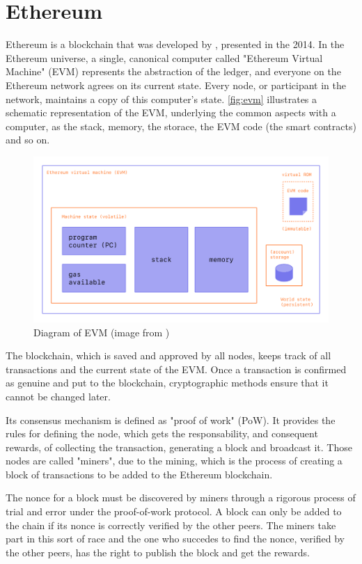 \section{Ethereum}
\label{sec:Backgroud:Ethereum}

Ethereum is a blockchain that was developed by \citet{Ethereum}, presented in the 2014.  
In the Ethereum universe, a single, canonical computer called "Ethereum Virtual Machine"  (EVM) represents the abstraction of the ledger, and everyone on the Ethereum network agrees on its current state.
Every node, or participant in the network, maintains a copy of this computer's state. 
\autoref{fig:evm} illustrates a schematic representation of the EVM, underlying the common aspects with a computer, as the stack, memory, the storace, the EVM code (the smart contracts) and so on.


\begin{figure}
    \centering
    \includegraphics[width=13cm]{logos/evm.png}
    \caption{Diagram of EVM (image from \cite{EthDocs})}
    \label{fig:evm}
\end{figure}

The blockchain, which is saved and approved by all nodes, keeps track of all transactions and the current state of the EVM. 
Once a transaction is confirmed as genuine and put to the blockchain, cryptographic methods ensure that it cannot be changed later.

Its consensus mechanism is defined as "proof of work" (PoW). 
It provides the rules for defining the node, which gets the responsability, and consequent rewards, of collecting the 
transaction, generating a block and broadcast it. 
Those nodes are called "miners", due to the mining, which is the process of creating a block of transactions to be added to the Ethereum blockchain. 

The nonce for a block must be discovered by miners through a rigorous process of trial and error under the proof-of-work protocol.
A block can only be added to the chain if its nonce is correctly verified by the other peers. 
The miners take part in this sort of race and the one who succedes to find the nonce, verified by the other peers, has the right to publish the block and get the rewards. 

